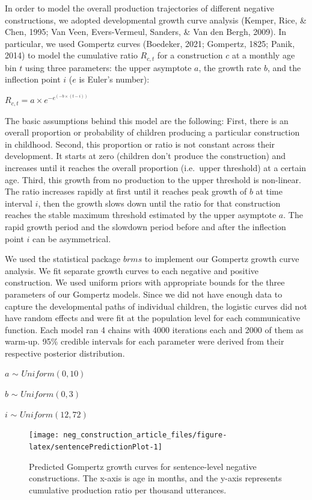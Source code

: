 \documentclass[
  man,floatsintext]{apa6}
\begin{document}
In order to model the overall production trajectories of different negative constructions, we adopted developmental growth curve analysis (Kemper, Rice, \& Chen, 1995; Van Veen, Evers-Vermeul, Sanders, \& Van den Bergh, 2009). In particular, we used Gompertz curves (Boedeker, 2021; Gompertz, 1825; Panik, 2014) to model the cumulative ratio \(R_{c,t}\) for a construction \(c\) at a monthly age bin \(t\) using three parameters: the upper asymptote \(a\), the growth rate \(b\), and the inflection point \(i\) (\(e\) is Euler's number):

\(R_{c, t} = a \times e^{-e^{(-b \times (t - i))}}\)

The basic assumptions behind this model are the following: First, there is an overall proportion or probability of children producing a particular construction in childhood. Second, this proportion or ratio is not constant across their development. It starts at zero (children don't produce the construction) and increases until it reaches the overall proportion (i.e.~upper threshold) at a certain age. Third, this growth from no production to the upper threshold is non-linear. The ratio increases rapidly at first until it reaches peak growth of \(b\) at time interval \(i\), then the growth slows down until the ratio for that construction reaches the stable maximum threshold estimated by the upper asymptote \(a\). The rapid growth period and the slowdown period before and after the inflection point \(i\) can be asymmetrical.

We used the statistical package \(brms\) to implement our Gompertz growth curve analysis. We fit separate growth curves to each negative and positive construction. We used uniform priors with appropriate bounds for the three parameters of our Gompertz models. Since we did not have enough data to capture the developmental paths of individual children, the logistic curves did not have random effects and were fit at the population level for each communicative function. Each model ran 4 chains with 4000 iterations each and 2000 of them as warm-up. 95\% credible intervals for each parameter were derived from their respective posterior distribution.

\(a\) \(\sim\) \(Uniform(0, 10)\)

\(b\) \(\sim\) \(Uniform(0, 3)\)

\(i\) \(\sim\) \(Uniform(12, 72)\)

\begin{figure}[H]

{\centering \texttt{[image: neg\_construction\_article\_files/figure-latex/sentencePredictionPlot-1]} 

}

\caption{Predicted Gompertz growth curves for sentence-level negative constructions. The x-axis is age in months, and the y-axis represents cumulative production ratio per thousand utterances.}\label{fig:sentencePredictionPlot}
\end{figure}
\end{document}
